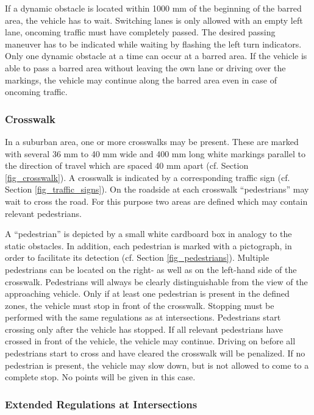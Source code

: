 If a dynamic obstacle is located within 1000 mm of the beginning of the barred
area, the vehicle has to wait. Switching lanes is only allowed with an empty
left lane, oncoming traffic must have completely passed. The desired passing
maneuver has to be indicated while waiting by flashing the left turn
indicators. Only one dynamic obstacle at a time can occur at a barred area. If
the vehicle is able to pass a barred area without leaving the own lane or
driving over the markings, the vehicle may continue along the barred area even
in case of oncoming traffic.

\subsubsection{Crosswalk}

In a suburban area, one or more crosswalks may be present. These are marked
with several 36 mm to 40 mm wide and 400 mm long white markings parallel to the
direction of travel which are spaced 40 mm apart (cf. Section
\ref{fig_crosswalk}). A crosswalk is indicated by a corresponding traffic sign
(cf. Section \ref{fig_traffic_signs}). On the roadside at each crosswalk
“pedestrians” may wait to cross the road. For this purpose two areas are
defined which may contain relevant pedestrians.

A “pedestrian” is depicted by a small white cardboard box in analogy to the
static obstacles. In addition, each pedestrian is marked with a pictograph, in
order to facilitate its detection (cf. Section \ref{fig_pedestrians}). Multiple
pedestrians can be located on the right- as well as on the left-hand side of
the crosswalk. Pedestrians will always be clearly distinguishable from the view
of the approaching vehicle. Only if at least one pedestrian is present in the
defined zones, the vehicle must stop in front of the crosswalk. Stopping must
be performed with the same regulations as at intersections. Pedestrians start
crossing only after the vehicle has stopped. If all relevant pedestrians have
crossed in front of the vehicle, the vehicle may continue. Driving on before
all pedestrians start to cross and have cleared the crosswalk will be
penalized. If no pedestrian is present, the vehicle may slow down, but is not
allowed to come to a complete stop. No points will be given in this case.

\subsubsection{Extended Regulations at Intersections}

